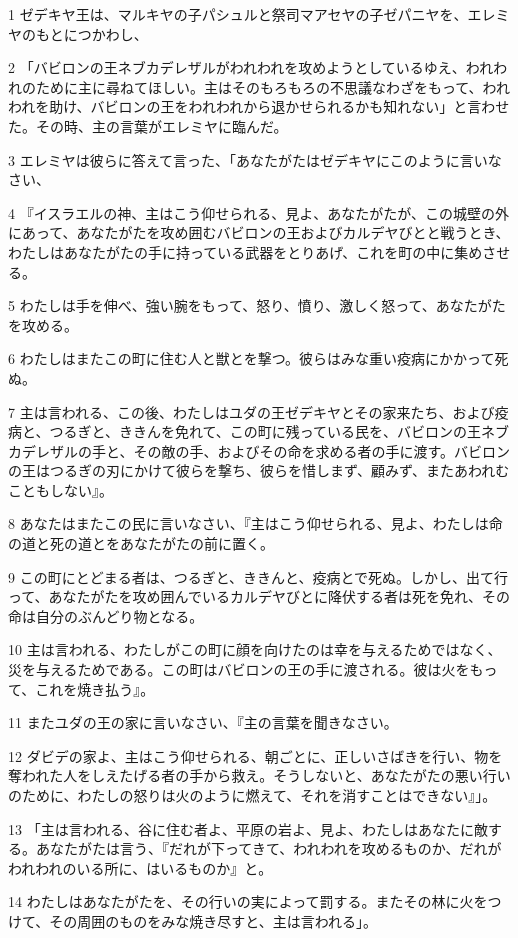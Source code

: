 \par 1 ゼデキヤ王は、マルキヤの子パシュルと祭司マアセヤの子ゼパニヤを、エレミヤのもとにつかわし、
\par 2 「バビロンの王ネブカデレザルがわれわれを攻めようとしているゆえ、われわれのために主に尋ねてほしい。主はそのもろもろの不思議なわざをもって、われわれを助け、バビロンの王をわれわれから退かせられるかも知れない」と言わせた。その時、主の言葉がエレミヤに臨んだ。
\par 3 エレミヤは彼らに答えて言った、「あなたがたはゼデキヤにこのように言いなさい、
\par 4 『イスラエルの神、主はこう仰せられる、見よ、あなたがたが、この城壁の外にあって、あなたがたを攻め囲むバビロンの王およびカルデヤびとと戦うとき、わたしはあなたがたの手に持っている武器をとりあげ、これを町の中に集めさせる。
\par 5 わたしは手を伸べ、強い腕をもって、怒り、憤り、激しく怒って、あなたがたを攻める。
\par 6 わたしはまたこの町に住む人と獣とを撃つ。彼らはみな重い疫病にかかって死ぬ。
\par 7 主は言われる、この後、わたしはユダの王ゼデキヤとその家来たち、および疫病と、つるぎと、ききんを免れて、この町に残っている民を、バビロンの王ネブカデレザルの手と、その敵の手、およびその命を求める者の手に渡す。バビロンの王はつるぎの刃にかけて彼らを撃ち、彼らを惜しまず、顧みず、またあわれむこともしない』。
\par 8 あなたはまたこの民に言いなさい、『主はこう仰せられる、見よ、わたしは命の道と死の道とをあなたがたの前に置く。
\par 9 この町にとどまる者は、つるぎと、ききんと、疫病とで死ぬ。しかし、出て行って、あなたがたを攻め囲んでいるカルデヤびとに降伏する者は死を免れ、その命は自分のぶんどり物となる。
\par 10 主は言われる、わたしがこの町に顔を向けたのは幸を与えるためではなく、災を与えるためである。この町はバビロンの王の手に渡される。彼は火をもって、これを焼き払う』。
\par 11 またユダの王の家に言いなさい、『主の言葉を聞きなさい。
\par 12 ダビデの家よ、主はこう仰せられる、朝ごとに、正しいさばきを行い、物を奪われた人をしえたげる者の手から救え。そうしないと、あなたがたの悪い行いのために、わたしの怒りは火のように燃えて、それを消すことはできない』」。
\par 13 「主は言われる、谷に住む者よ、平原の岩よ、見よ、わたしはあなたに敵する。あなたがたは言う、『だれが下ってきて、われわれを攻めるものか、だれがわれわれのいる所に、はいるものか』と。
\par 14 わたしはあなたがたを、その行いの実によって罰する。またその林に火をつけて、その周囲のものをみな焼き尽すと、主は言われる」。

